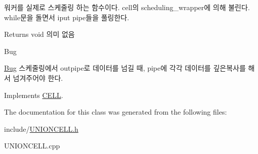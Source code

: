 워커를 실제로 스케줄링 하는 함수이다. cell의 scheduling\+\_\+wrapper에 의해 불린다. while문을 돌면서 iput pipe들을 풀링한다. \begin{DoxyReturn}{Returns}
void 의미 없음 
\end{DoxyReturn}
\begin{DoxyRefDesc}{Bug}
\item[\hyperlink{bug__bug000002}{Bug}]스케줄링에서 outpipe로 데이터를 넘길 때, pipe에 각각 데이터를 깊은복사를 해서 넘겨주어야 한다. \end{DoxyRefDesc}


Implements \hyperlink{classCELL_adcd2e66700a2c6f0cb234cbe63d2e10c}{C\+E\+L\+L}.



The documentation for this class was generated from the following files\+:\begin{DoxyCompactItemize}
\item 
include/\hyperlink{UNIONCELL_8h}{U\+N\+I\+O\+N\+C\+E\+L\+L.\+h}\item 
U\+N\+I\+O\+N\+C\+E\+L\+L.\+cpp\end{DoxyCompactItemize}
